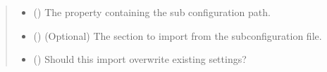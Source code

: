 \documentclass[letterpaper,10pt,english]{sphinxmanual}
\begin{document}
\begin{fulllineitems}
\begin{fulllineitems}
\begin{quote}
\begin{description}
\begin{itemize}
\item {} 
\sphinxAtStartPar
{} () \textendash{} The property containing the sub\sphinxhyphen{}
configuration path.

\item {} 
\sphinxAtStartPar
{} () \textendash{} (Optional) The section to import from the
sub\sphinxhyphen{}configuration file.

\item {} 
\sphinxAtStartPar
{} () \textendash{} Should this import overwrite existing settings?

\end{itemize}

\end{description}\end{quote}

\end{fulllineitems}



\end{fulllineitems}
\end{document}
